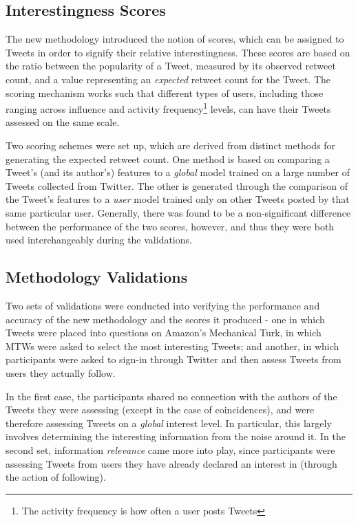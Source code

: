 \subsection{Interestingness Scores}
The new methodology introduced the notion of scores, which can be assigned to Tweets in order to signify their relative interestingness. These scores are based on the ratio between the popularity of a Tweet, measured by its observed retweet count, and a value representing an \textit{expected} retweet count for the Tweet. The scoring mechanism works such that different types of users, including those ranging across influence and activity frequency\footnote{The activity frequency is how often a user posts Tweets} levels, can have their Tweets assessed on the same scale. 

Two scoring schemes were set up, which are derived from distinct methods for generating the expected retweet count. One method is based on comparing a Tweet's (and its author's) features to a \textit{global} model trained on a large number of Tweets collected from Twitter. The other is generated through the comparison of the Tweet's features to a \textit{user} model trained only on other Tweets posted by that same particular user. Generally, there was found to be a non-significant difference between the performance of the two scores, however, and thus they were both used interchangeably during the validations.

\subsection{Methodology Validations}
Two sets of validations were conducted into verifying the performance and accuracy of the new methodology and the scores it produced - one in which Tweets were placed into questions on Amazon's Mechanical Turk, in which MTWs were asked to select the most interesting Tweets; and another, in which participants were asked to sign-in through Twitter and then assess Tweets from users they actually follow.

In the first case, the participants shared no connection with the authors of the Tweets they were assessing (except in the case of coincidences), and were therefore assessing Tweets on a \textit{global} interest level. In particular, this largely involves determining the interesting information from the noise around it. In the second set, information \textit{relevance} came more into play, since participants were assessing Tweets from users they have already declared an interest in (through the action of following).

